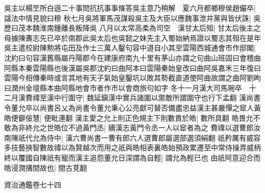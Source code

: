 吳主以楊笁所白遜二十事問抗抗事事條答吳主意乃稍解　夏六月都鄉穆侯趙儼卒|{
	諡法中情見貌曰穆}
秋七月吳將軍馬茂謀殺吳主及大臣以應魏事泄并黨與皆伏誅|{
	吳歷曰茂本魏淮南鍾離長叛降吳}
八月以太常高柔為司空　漢甘太后殂|{
	甘太后後主之母據陳夀志先已卒於南郡此吳太后也吳懿之妹先主入蜀始納焉證以蜀志其殂在是年}
吳主遣校尉陳勲將屯田及作士三萬人鑿句容中道自小其至雲陽西城通會市作邸閣|{
	沈約曰句容漢舊縣屬丹陽郡今在建康府南九十里有茅山亦謂之句曲山班固曰會稽曲阿縣本秦雲陽縣也後漢屬吳郡沈約曰曲阿本曰雲陽秦始皇改曰曲阿吳嘉禾三年復曰雲陽今相傳秦時或言其地有天子氣始皇鑿坑以敗其勢截直道使阿曲故謂之曲阿劉昫曰潤州金壇縣本曲阿縣地會市者作市以會商旅句如字}
冬十一月漢大司馬琬卒　十二月漢費禕至漢中行圍守|{
	魏延鎭漢中實兵諸圍以禦敵所謂圍守也行下孟翻}
漢尚書令董允卒以尚書呂乂為尚書令董允秉心公亮獻可替否備盡忠益漢主甚嚴憚之䆠人黃皓便僻佞慧|{
	便毗連翻}
漢主愛之允上則正色規主下則數責於皓|{
	數所具翻}
皓畏允不敢為非終允之世皓位不過黃門丞|{
	續漢志黃門令丞一人以䆠者為之}
費禕以選曹郎汝南陳祇代允為侍中|{
	漢六曹尚書一曹有郎六人選曹郎屬選部選須絹翻}
祇矜厲有威容多技藝挾智數故禕以為賢越次而用之祇與皓相表裏皓始預政累遷至中常侍操弄威柄終以覆國自陳祇有寵而漢主追怨董允日深謂為自輕|{
	謂允為輕已也}
由祇阿意迎合而皓浸潤搆間故也|{
	間古莧翻}


資治通鑑卷七十四
